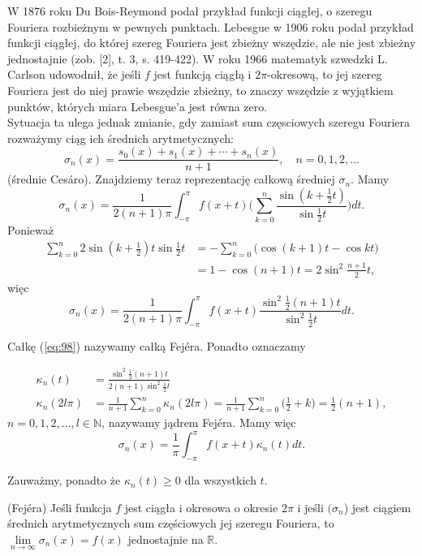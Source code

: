 \documentclass[leqno]{article}
\begin{document}
\begin{justify}
W 1876 roku Du Bois-Reymond podał przykład funkcji ciągłej, o szeregu Fouriera rozbieżnym w pewnych punktach. Lebesgue w 1906 roku
podał przykład funkcji ciągłej, do której szereg Fouriera jest zbieżny wszędzie, ale nie jest zbieżny jednostajnie (zob. [2], t. 3, s. 419-422).
W roku 1966 matematyk szwedzki L. Carlson udowodnił, że jeśli $f$ jest funkcją ciągłą i $2\pi$-okresową, to jej szereg Fouriera jest do niej
prawie wszędzie zbieżny, to znaczy wszędzie z wyjątkiem punktów, których miara Lebesgue'a jest równa zero. \\
Sytuacja ta ulega jednak zmianie, gdy zamiast sum częsciowych szeregu Fouriera rozważymy ciąg ich średnich arytmetycznych:
\[
    \sigma_n(x) = \frac{s_0(x) + s_1(x) + \cdots + s_n(x)}{n + 1}, \quad n = 0,1,2,\ldots
\]
(średnie Cesáro). Znajdziemy teraz reprezentację całkową średniej $\sigma_n$. Mamy
\[
    \sigma_n(x) = \frac{1}{2(n+1)\pi}\int_{-\pi}^{\pi}f(x+t)\Bigg(\sum_{k=0}^{n}\frac{\sin (k+\frac{1}{2}t)}{\sin \frac{1}{2}t}\Bigg)dt.
\]
Ponieważ
\begin{align*}
    \sum_{k=0}^{n}2\sin(k+\frac{1}{2})t\sin\frac{1}{2}t &= -\sum_{k=0}^{n}\Big(\cos(k+1)t - \cos kt \Big) \\
        &= 1 - \cos(n+1)t = 2 \sin^2 \frac{n+1}{2}t,
\end{align*}
więc 
\begin{equation}\label{eq:98}
    \sigma_n(x) = \frac{1}{2(n+1)\pi}\int_{-\pi}^{\pi}f(x+t)\frac{\sin^2\frac{1}{2}(n+1)t}{\sin^2\frac{1}{2}t}dt.
\end{equation}

\begin{defn}
    Całkę (\ref{eq:98}) nazywamy całką Fejéra. Ponadto oznaczamy
\end{defn}
\begin{align*}
    \kappa_n(t) &= \frac{\sin^2\frac{1}{2}(n+1)t}{2(n+1)\sin^2\frac{1}{2}t} \\
    \kappa_n(2l\pi) &= \frac{1}{n+1}\sum_{k=0}^{n}\kappa_n(2l\pi) = \frac{1}{n+1}\sum_{k=0}^{n}\Big(\frac{1}{2} + k\Big) = \frac{1}{2}(n+1),
\end{align*}
$n = 0,1,2, \ldots, l \in \mathbb{N}$, nazywamy jądrem Fejéra. Mamy więc
\begin{equation}\label{eq:99}
    \sigma_n(x) = \frac{1}{\pi}\int_{-\pi}^{\pi}f(x+t)\kappa_n(t)dt.
\end{equation}

Zauważmy, ponadto że $\kappa_n(t) \geqslant 0$ dla wszystkich $t$. 

\begin{theorem}
{
    (Fejéra) Jeśli funkcja $f$ jest ciągła i okresowa o okresie $2\pi$ i jeśli $(\sigma_n$) jest ciągiem średnich arytmetycznych sum częściowych jej
    szeregu Fouriera, to $\lim\limits_{n \to \infty}\sigma_n(x) = f(x)$ jednostajnie na $\mathbb{R}$. 
}
\end{theorem}


\end{justify}
\end{document}
